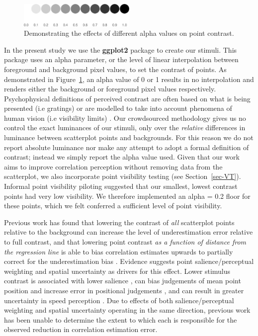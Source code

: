 \documentclass[manuscript, review, anonymous, screen]{acmart}
\begin{document}
\begin{figure}

\includegraphics[width=0.5\textwidth,height=\textheight]{size_and_contrast_new_files/figure-pdf/fig-alpha-examples-1.pdf} \hfill{}

\caption{\label{fig-alpha-examples}Demonstrating the effects of
different alpha values on point contrast.}

\end{figure}

In the present study we use the \textbf{ggplot2} package
\citep{hadley_gg2016} to create our stimuli. This package uses an alpha
parameter, or the level of linear interpolation \citep{stone_2008}
between foreground and background pixel values, to set the contrast of
points. As demonstrated in Figure~\ref{fig-alpha-examples}, an alpha
value of 0 or 1 results in no interpolation and renders either the
background or foreground pixel values respectively. Psychophysical
definitions of perceived contrast are often based on what is being
presented (i.e gratings) or are modelled to take into account phenomena
of human vision (i.e visibility limits) \citep{zuffi_2007}. Our
crowdsourced methodology gives us no control the exact luminances of our
stimuli, only over the \emph{relative} differences in luminance between
scatterplot points and backgrounds. For this reason we do not report
absolute luminance nor make any attempt to adopt a formal definition of
contrast; instead we simply report the alpha value used. Given that our
work aims to improve correlation perception without removing data from
the scatterplot, we also incorporate point visibility testing (see
Section~\ref{sec-VT}). Informal point visibility piloting suggested that
our smallest, lowest contrast points had very low visibility. We
therefore implemented an alpha = 0.2 floor for these points, which we
felt conferred a sufficient level of point visibility.

Previous work has found that lowering the contrast of \emph{all}
scatterplot points relative to the background can increase the level of
underestimation error relative to full contrast, and that lowering point
contrast \emph{as a function of distance from the regression line} is
able to bias correlation estimates upwards to partially correct for the
underestimation bias \citep{strain_2023}. Evidence suggests point
salience/perceptual weighting and spatial uncertainty as drivers for
this effect. Lower stimulus contrast is associated with lower salience
\citep{healey_2011}, can bias judgements of mean point position
\citep{hong_2021} and increase error in positional judgements
\citep{wehrhahn_1990}, and can result in greater uncertainty in speed
perception \citep{champion_2017}. Due to effects of both
salience/perceptual weighting and spatial uncertainty operating in the
same direction, previous work \citep{strain_2023} has been unable to
determine the extent to which each is responsible for the observed
reduction in correlation estimation error.
\end{document}
